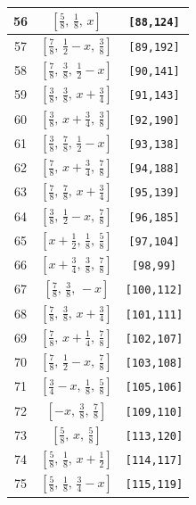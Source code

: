 \documentclass[fleqn,8pt]{jsarticle}
\begin{document}
\begin{longtable}{ccc}
56 & $\left[ \frac{5}{8},\, \frac{1}{8},\, x \right]$ & {\tt [88,124]} \\ \hline
57 & $\left[ \frac{7}{8},\, \frac{1}{2} - x,\, \frac{3}{8} \right]$ & {\tt [89,192]} \\ \hline
58 & $\left[ \frac{7}{8},\, \frac{3}{8},\, \frac{1}{2} - x \right]$ & {\tt [90,141]} \\ \hline
59 & $\left[ \frac{3}{8},\, \frac{3}{8},\, x + \frac{3}{4} \right]$ & {\tt [91,143]} \\ \hline
60 & $\left[ \frac{3}{8},\, x + \frac{3}{4},\, \frac{3}{8} \right]$ & {\tt [92,190]} \\ \hline
61 & $\left[ \frac{3}{8},\, \frac{7}{8},\, \frac{1}{2} - x \right]$ & {\tt [93,138]} \\ \hline
62 & $\left[ \frac{7}{8},\, x + \frac{3}{4},\, \frac{7}{8} \right]$ & {\tt [94,188]} \\ \hline
63 & $\left[ \frac{7}{8},\, \frac{7}{8},\, x + \frac{3}{4} \right]$ & {\tt [95,139]} \\ \hline
64 & $\left[ \frac{3}{8},\, \frac{1}{2} - x,\, \frac{7}{8} \right]$ & {\tt [96,185]} \\ \hline
65 & $\left[ x + \frac{1}{2},\, \frac{1}{8},\, \frac{5}{8} \right]$ & {\tt [97,104]} \\ \hline
66 & $\left[ x + \frac{3}{4},\, \frac{3}{8},\, \frac{7}{8} \right]$ & {\tt [98,99]} \\ \hline
67 & $\left[ \frac{7}{8},\, \frac{3}{8},\, - x \right]$ & {\tt [100,112]} \\ \hline
68 & $\left[ \frac{7}{8},\, \frac{3}{8},\, x + \frac{3}{4} \right]$ & {\tt [101,111]} \\ \hline
69 & $\left[ \frac{7}{8},\, x + \frac{1}{4},\, \frac{7}{8} \right]$ & {\tt [102,107]} \\ \hline
70 & $\left[ \frac{7}{8},\, \frac{1}{2} - x,\, \frac{7}{8} \right]$ & {\tt [103,108]} \\ \hline
71 & $\left[ \frac{3}{4} - x,\, \frac{1}{8},\, \frac{5}{8} \right]$ & {\tt [105,106]} \\ \hline
72 & $\left[ - x,\, \frac{3}{8},\, \frac{7}{8} \right]$ & {\tt [109,110]} \\ \hline
73 & $\left[ \frac{5}{8},\, x,\, \frac{5}{8} \right]$ & {\tt [113,120]} \\ \hline
74 & $\left[ \frac{5}{8},\, \frac{1}{8},\, x + \frac{1}{2} \right]$ & {\tt [114,117]} \\ \hline
75 & $\left[ \frac{5}{8},\, \frac{1}{8},\, \frac{3}{4} - x \right]$ & {\tt [115,119]} \\ \hline

\end{longtable}
\end{document}
